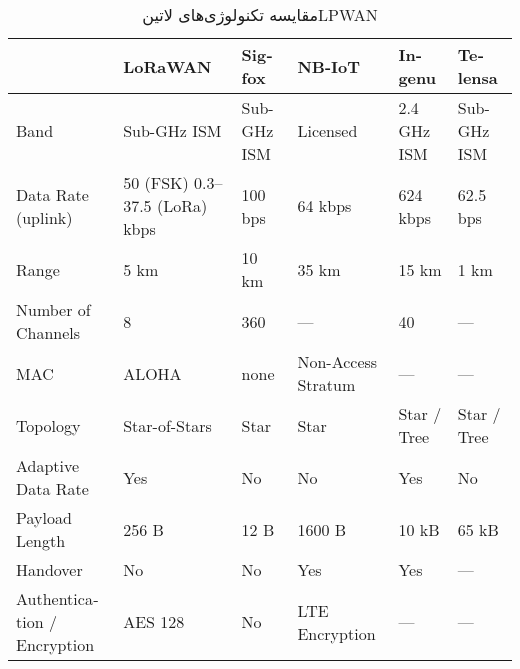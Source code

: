\begin{table}
\caption{مقایسه تکنولوژی‌های ‌لاتین{LPWAN}    }
\label{جدول: مقایسه تکنولوژی‌های LPWAN}
\begin{latin}\begin{tabularx}
  {\textwidth}
  {|*{6}{X|}}
  \toprule

  &
  LoRaWAN &
  Sigfox &
  NB-IoT &
  Ingenu &
  Telensa \\

  \midrule

  Band &
  Sub-GHz ISM &
  Sub-GHz ISM &
  Licensed &
  2.4 GHz ISM &
  Sub-GHz ISM \\

  \midrule

  Data Rate (uplink) &
  50 (FSK) 0.3--37.5 (LoRa) kbps &
  100 bps &
  64 kbps &
  624 kbps &
  62.5 bps \\

  \midrule

  Range &
  5 km &
  10 km &
  35 km &
  15 km &
  1 km \\

  \midrule

  Number of Channels &
  8 &
  360 &
  --- &
  40 &
  --- \\

  \midrule

  MAC &
  ALOHA &
  none &
  Non-Access Stratum &
  --- &
  --- \\

  \midrule

  Topology &
  Star-of-Stars &
  Star &
  Star &
  Star / Tree &
  Star / Tree \\

  \midrule

  Adaptive Data Rate &
  Yes &
  No &
  No &
  Yes &
  No \\

  \midrule

  Payload Length &
  256 B &
  12 B &
  1600 B &
  10 kB &
  65 kB \\

  \midrule

  Handover &
  No &
  No &
  Yes &
  Yes &
  --- \\

  \midrule

  Authentication / Encryption &
  AES 128 &
  No &
  LTE Encryption &
  --- &
  --- \\


\end{tabularx}
\end{latin}
\end{table}
